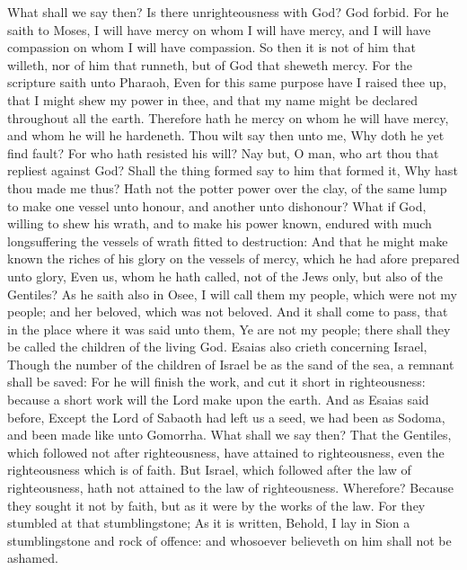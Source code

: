  What shall we say then? Is there unrighteousness with God?
God forbid.  For he saith to Moses, I will have mercy on
whom I will have mercy, and I will have compassion on whom I will have
compassion.  So then it is not of him that willeth, nor of
him that runneth, but of God that sheweth mercy.  For the
scripture saith unto Pharaoh, Even for this same purpose have I raised
thee up, that I might shew my power in thee, and that my name might be
declared throughout all the earth.  Therefore hath he mercy
on whom he will have mercy, and whom he will he hardeneth. 
Thou wilt say then unto me, Why doth he yet find fault? For who hath
resisted his will?  Nay but, O man, who art thou that
repliest against God? Shall the thing formed say to him that formed it,
Why hast thou made me thus?  Hath not the potter power over
the clay, of the same lump to make one vessel unto honour, and another
unto dishonour?  What if God, willing to shew his wrath,
and to make his power known, endured with much longsuffering the vessels
of wrath fitted to destruction:  And that he might make
known the riches of his glory on the vessels of mercy, which he had
afore prepared unto glory,  Even us, whom he hath called,
not of the Jews only, but also of the Gentiles?  As he
saith also in Osee, I will call them my people, which were not my
people; and her beloved, which was not beloved.  And it
shall come to pass, that in the place where it was said unto them, Ye
are not my people; there shall they be called the children of the living
God.  Esaias also crieth concerning Israel, Though the
number of the children of Israel be as the sand of the sea, a remnant
shall be saved:  For he will finish the work, and cut it
short in righteousness: because a short work will the Lord make upon the
earth.  And as Esaias said before, Except the Lord of
Sabaoth had left us a seed, we had been as Sodoma, and been made like
unto Gomorrha.  What shall we say then? That the Gentiles,
which followed not after righteousness, have attained to righteousness,
even the righteousness which is of faith.  But Israel,
which followed after the law of righteousness, hath not attained to the
law of righteousness.  Wherefore? Because they sought it
not by faith, but as it were by the works of the law. For they stumbled
at that stumblingstone;  As it is written, Behold, I lay in
Sion a stumblingstone and rock of offence: and whosoever believeth on
him shall not be ashamed.

